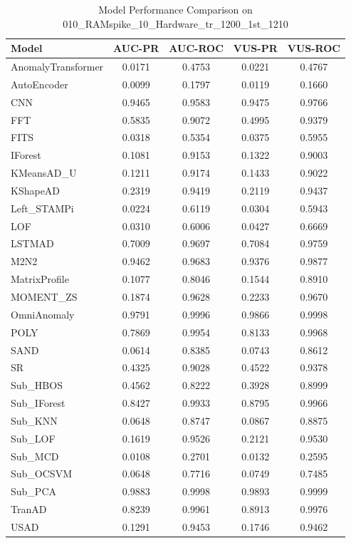 \documentclass[12pt,oneside]{article}
\begin{document}
\begin{table}[H]
    \centering
    \caption{Model Performance Comparison on 010\_RAMspike\_10\_Hardware\_tr\_1200\_1st\_1210}
    \begin{tabular}{|l|c|c|c|c|}
        \toprule
        \textbf{Model} & \textbf{AUC-PR} & \textbf{AUC-ROC} & \textbf{VUS-PR} & \textbf{VUS-ROC} \\
        \midrule
        AnomalyTransformer & 0.0171 & 0.4753 & 0.0221 & 0.4767 \\
        AutoEncoder & 0.0099 & 0.1797 & 0.0119 & 0.1660 \\
        CNN & 0.9465 & 0.9583 & 0.9475 & 0.9766 \\
        FFT & 0.5835 & 0.9072 & 0.4995 & 0.9379 \\
        FITS & 0.0318 & 0.5354 & 0.0375 & 0.5955 \\
        IForest & 0.1081 & 0.9153 & 0.1322 & 0.9003 \\
        KMeansAD\_U & 0.1211 & 0.9174 & 0.1433 & 0.9022 \\
        KShapeAD & 0.2319 & 0.9419 & 0.2119 & 0.9437 \\
        Left\_STAMPi & 0.0224 & 0.6119 & 0.0304 & 0.5943 \\
        LOF & 0.0310 & 0.6006 & 0.0427 & 0.6669 \\
        LSTMAD & 0.7009 & 0.9697 & 0.7084 & 0.9759 \\
        M2N2 & 0.9462 & 0.9683 & 0.9376 & 0.9877 \\
        MatrixProfile & 0.1077 & 0.8046 & 0.1544 & 0.8910 \\
        MOMENT\_ZS & 0.1874 & 0.9628 & 0.2233 & 0.9670 \\
        OmniAnomaly & 0.9791 & 0.9996 & 0.9866 & 0.9998 \\
        POLY & 0.7869 & 0.9954 & 0.8133 & 0.9968 \\
        SAND & 0.0614 & 0.8385 & 0.0743 & 0.8612 \\
        SR & 0.4325 & 0.9028 & 0.4522 & 0.9378 \\
        Sub\_HBOS & 0.4562 & 0.8222 & 0.3928 & 0.8999 \\
        Sub\_IForest & 0.8427 & 0.9933 & 0.8795 & 0.9966 \\
        Sub\_KNN & 0.0648 & 0.8747 & 0.0867 & 0.8875 \\
        Sub\_LOF & 0.1619 & 0.9526 & 0.2121 & 0.9530 \\
        Sub\_MCD & 0.0108 & 0.2701 & 0.0132 & 0.2595 \\
        Sub\_OCSVM & 0.0648 & 0.7716 & 0.0749 & 0.7485 \\
        Sub\_PCA & 0.9883 & 0.9998 & 0.9893 & 0.9999 \\
        TranAD & 0.8239 & 0.9961 & 0.8913 & 0.9976 \\
        USAD & 0.1291 & 0.9453 & 0.1746 & 0.9462 \\
        \bottomrule
    \end{tabular}
    
    \label{tab:model_performance_RAMspike}
\end{table}
\end{document}
